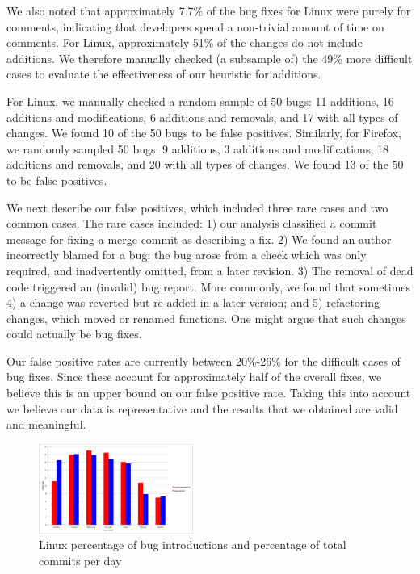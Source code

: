 We also noted that approximately 7.7\% of the bug fixes for Linux were
purely for comments, indicating that developers spend a non-trivial
amount of time on comments. For Linux, approximately 51\% of the
changes do not include additions. We therefore manually checked (a
subsample of) the 49\% more difficult cases to evaluate the
effectiveness of our heuristic for additions.

For Linux, we manually checked a random sample of 50 bugs: 11
additions, 16 additions and modifications, 6 additions and removals,
and 17 with all types of changes. We found 10 of the 50 bugs to be
false positives. Similarly, for Firefox, we randomly sampled 50 bugs:
9 additions, 3 additions and modifications, 18 additions and removals,
and 20 with all types of changes. We found 13 of the 50 to be false
positives. 

We next describe our false positives, which included three rare cases
and two common cases. The rare cases included: 1) our analysis
classified a commit message for fixing a merge commit as describing a
fix. 2) We found an author incorrectly blamed for a bug: the bug arose
from a check which was only required, and inadvertently omitted, from
a later revision. 3) The removal of dead code triggered an (invalid)
bug report. More commonly, we found that sometimes 4) a change was
reverted but re-added in a later version; and 5) refactoring changes,
which moved or renamed functions. One might argue that such changes
could actually be bug fixes.


Our false positive rates are currently between 20\%-26\% for the
difficult cases of bug fixes. Since these account for approximately
half of the overall fixes, we believe this is an upper bound on our
false positive rate. Taking this into account we believe our data is
representative and the results that we obtained are valid and meaningful.


\begin{figure}
\begin{center}
\includegraphics[width=0.45\textwidth]{linux_bug_introduction_day_of_week.png}
\end{center}
\caption{Linux percentage of bug introductions and percentage of total commits per day}
\label{fig-linux-weekday}
\end{figure}

